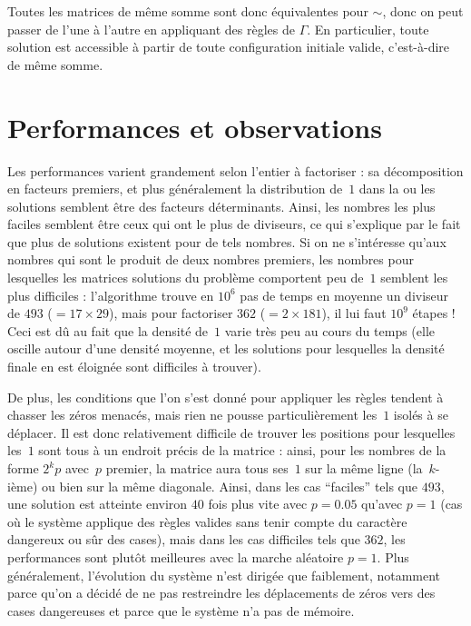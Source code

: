 \documentclass[11pt, openany, a4paper]{article}
\begin{document}
Toutes les matrices de même somme sont donc équivalentes pour $\sim$, donc on peut passer de l'une à l'autre en appliquant des règles de $\Gamma$. En particulier, toute solution est accessible à partir de toute configuration initiale valide, c'est-à-dire de même somme. 



\section*{Performances et observations}

Les performances varient grandement selon l'entier à factoriser : sa dé\-composition en facteurs premiers, et plus généralement la distribution de~$1$ dans la ou les solutions semblent être des facteurs déterminants. Ainsi, les nombres les plus faciles semblent être ceux qui ont le plus de diviseurs, ce qui s'explique par le fait que plus de solutions existent pour de tels nombres. Si on ne s'intéresse qu'aux nombres qui sont le produit de deux nombres premiers, les nombres pour lesquelles les matrices solutions du problème comportent peu de~$1$ semblent les plus difficiles : l'algorithme trouve en $10^6$ pas de temps en moyenne un diviseur de $493$ ($ = 17\times 29$), mais pour factoriser $362$ ($ = 2\times 181$), il lui faut $10^9$ étapes ! Ceci est dû au fait que la densité de~$1$ varie très peu au cours du temps (elle oscille autour d'une densité moyenne, et les solutions pour lesquelles la densité finale en est éloignée sont difficiles à trouver). 

\medskip

De plus, les conditions que l'on s'est donné pour appliquer les règles tendent à chasser les zéros menacés, mais rien ne pousse particulièrement les~$1$ isolés à se déplacer. Il est donc relativement difficile de trouver les positions pour lesquelles les~$1$ sont tous à un endroit précis de la matrice : ainsi, pour les nombres de la forme $2^kp$ avec~$p$ premier, la matrice aura tous ses~$1$ sur la même ligne (la~$k$-ième) ou bien sur la même diagonale. Ainsi, dans les cas ``faciles'' tels que $493$, une solution est atteinte environ $40$ fois plus vite avec $p=0.05$ qu'avec $p=1$ (cas où le système applique des règles valides sans tenir compte du caractère dangereux ou sûr des cases), mais dans les cas difficiles tels que $362$, les performances sont plutôt meilleures avec la marche aléatoire $p=1$. Plus généralement, l'évolution du système n'est dirigée que faiblement, notamment parce qu'on a décidé de ne pas restreindre les déplacements de zéros vers des cases dangereuses et parce que le système n'a pas de mémoire.
\end{document}
